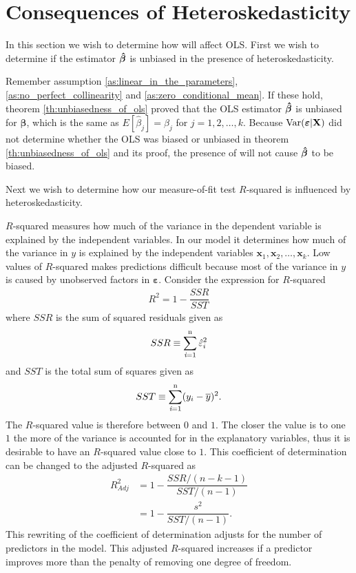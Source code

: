 \section{Consequences of Heteroskedasticity}\label{sec:consequence_of_hetero}
In this section we wish to determine how \hetero will affect OLS. 
First we wish to determine if the estimator $\operatorname{\boldsymbol{\hat{\beta}}}$ is unbiased in the presence of heteroskedasticity.  

Remember assumption \ref{as:linear_in_the_parameters}, \ref{as:no_perfect_collinearity} and \ref{as:zero_conditional_mean}. If these hold, theorem \ref{th:unbiasedness_of_ols} proved that the OLS estimator $\operatorname{\boldsymbol{\hat{\beta}}}$ is unbiased for $\boldsymbol{\beta}$, which is the same as $E[\hat{\beta}_j] = \beta_j
$ for $j = 1,2, \ldots, k$. 
Because $\operatorname{\text{Var}}(\boldsymbol{\varepsilon} | \mathbf{X})$ did not determine whether the OLS was biased or unbiased in theorem \ref{th:unbiasedness_of_ols} and its proof, the presence of \hetero will not cause $\operatorname{\boldsymbol{\hat{\beta}}}$ to be biased. 

Next we wish to determine how our measure-of-fit test $R$-squared is influenced by heteroskedasticity.

$R$-squared measures how much of the variance in the dependent variable is explained by the independent variables. In our model it determines how much of the variance in $y$ is explained by the independent variables $\mathbf{x}_1, \mathbf{x}_2, \ldots, \mathbf{x}_k$. 
Low values of $R$-squared makes predictions difficult because most of the variance in $y$ is caused by unobserved factors in $\boldsymbol{\varepsilon}$.
Consider the expression for $R$-squared
\begin{align*}
    R^2 = 1 - \dfrac{SSR}{SST}
\end{align*}
where $SSR$ is the sum of squared residuals given as
\begin{align*}
    SSR \equiv \operatorname{\sum_{\textit{i}=1}^n} \hat{\varepsilon}_i^2
\end{align*}
and $SST$ is the total sum of squares given as
\begin{align*}
    SST \equiv \operatorname{\sum_{\textit{i}=1}^n} (y_i - \overline{y})^2. 
\end{align*}
The $R$-squared value is therefore between $0$ and $1$. The closer the value is to one $1$ the more of the variance is accounted for in the explanatory variables, thus it is desirable to have an $R$-squared value close to $1$.
This coefficient of determination can be changed to the adjusted $R$-squared as
\begin{align*}
    R^2_{Adj} &= 1 - \dfrac{SSR/(n - k - 1)}{SST/(n - 1)}\\
      &= 1 - \dfrac{s^2}{SST/(n-1)}.
\end{align*}
This rewriting of the coefficient of determination adjusts for the number of predictors in the model. This adjusted $R$-squared increases if a predictor improves more than the penalty of removing one degree of freedom. 

